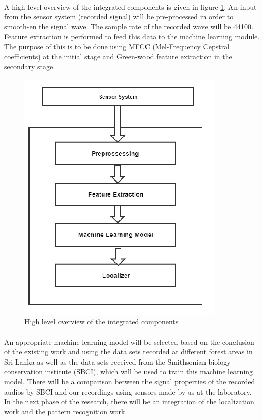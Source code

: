\documentclass[12pt]{article}
\numberwithin{figure}{section}
\numberwithin{table}{section}
\begin{document}
\paragraph{}
A high level overview of the integrated components is given in figure \ref{d:H}. An input from the sensor system (recorded signal) will be pre-processed in order to smooth-en the signal wave. The sample rate of the recorded wave will be 44100. Feature extraction is performed to feed this data to the machine learning module. The purpose of this is to be done using MFCC (Mel-Frequency Cepstral coefficients) at the initial stage and Green-wood feature extraction in the secondary stage. 

\begin{figure}[H]
\centering
\includegraphics{flow.png}
\caption{High level overview of the integrated components}
\label{d:H}
\end{figure}

\paragraph{}
An appropriate machine learning model will be selected based on the conclusion of the existing work and using the data sets recorded at different forest areas in Sri Lanka as well as the data sets received from the Smithsonian biology conservation institute (SBCI), which will be used to train this machine learning model. There will be a comparison between the signal properties of the recorded audios by SBCI and our recordings using sensors made by us at the laboratory. In the next phase of the research, there will be an integration of the localization work and the pattern recognition work.
\end{document}
